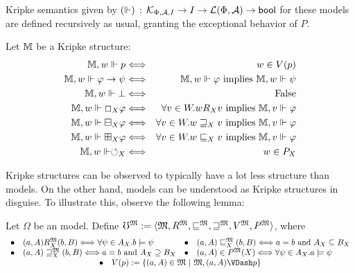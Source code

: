 Kripke semantics given by $(\Vdash) \colons \mathcal{K}_{\Phi, \mathcal{A}, I} \to I
\rightarrow \mathcal{L}(\Phi, \mathcal{A}) \to \text{\tmtextsf{bool}}$ for these models are defined recursively
as usual, granting the exceptional behavior of $P$.
\begin{definition}
  Let $\mathbbm{M}$ be a Kripke structure:
  \begin{eqnarray*}
    \mathbbm{M}, w \Vdash p & \Longleftrightarrow & w \in V
    (p)\\
    \mathbbm{M}, w \Vdash \phi \rightarrow \psi & \Longleftrightarrow &
    \mathbbm{M}, w \Vdash \phi \text{ implies } \mathbbm{M}, w \Vdash \psi\\
    \mathbbm{M}, w \Vdash \bot & \Longleftrightarrow & \text{False}\\
    \mathbbm{M}, w \Vdash \Box_X \phi & \Longleftrightarrow & \forall v \in
    W . w R_X v \text{ implies } \mathbbm{M}, v
    \Vdash \phi\\
    \mathbbm{M}, w \Vdash \boxminus_X \phi & \Longleftrightarrow & \forall v
    \in W . w \sqsupseteq_X v \text{ implies }
    \mathbbm{M}, v \Vdash \phi\\
    \mathbbm{M}, w \Vdash \boxplus_X \phi & \Longleftrightarrow & \forall v
    \in W . w \sqsubseteq_X v \text{ implies }
    \mathbbm{M}, v \Vdash \phi\\
    \mathbbm{M}, w \Vdash \circlearrowleft_X & \Longleftrightarrow & w \in
    P_X
  \end{eqnarray*}
\end{definition}
Kripke structures can be observed to typically have a lot less structure than
 models.  On the other hand,   models
can be understood as Kripke structures in disguise.  To illustrate
this, observe the following lemma:
\begin{definition}\label{omega-translation}
Let $\Omega$ be an  model.  Define
  $\mho^{\Omega} \assign \langle \Omega, R^{\Omega},
  \sqsubseteq^{\Omega}, \sqsupseteq^{\Omega}, V^{\Omega},
  P^{\Omega} \rangle$, where
  \[ \begin{array}{llll}
       \bullet & \text{$(a, A) R^{\Omega}_X (b, B) \Longleftrightarrow \forall
       \psi \in A_X .b \models \psi$} & \bullet & (a, A)
       \sqsubseteq^{\Omega}_X (b, B) \Longleftrightarrow a = b \text{ and }
       A_X \subseteq B_X\\
       \bullet & (a, A) \sqsupseteq^{\Omega}_X (b, B) \Longleftrightarrow a =
       b \text{ and } A_X \supseteq B_X & \bullet & (a, A) \in
       P^{\Omega} (X) \Longleftrightarrow \forall \psi \in
       A_X .a \models \psi \\
\multicolumn{4}{c}{\bullet\ \ \ V(p) := \{ (a,A) \in \mathfrak{M} \ |\ \mathfrak{M},(a,A)\VDash p\}}
     \end{array} \]
\end{definition}
